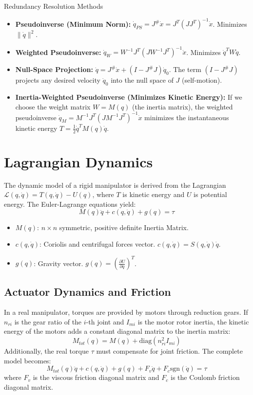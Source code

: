 \documentclass[11pt,a4paper]{article}
\begin{document}
\begin{theorybox}{Redundancy Resolution Methods}
\begin{itemize}
    \item \textbf{Pseudoinverse (Minimum Norm):} $\dot{q}_{PS} = J^\# \dot{x} = J^T(JJ^T)^{-1}\dot{x}$. Minimizes $\|\dot{q}\|^2$.
    \item \textbf{Weighted Pseudoinverse:} $\dot{q}_W = W^{-1}J^T(J W^{-1} J^T)^{-1}\dot{x}$. Minimizes $\dot{q}^T W \dot{q}$.
    \item \textbf{Null-Space Projection:} $\dot{q} = J^\# \dot{x} + (I - J^\# J)\dot{q}_0$. The term $(I - J^\# J)$ projects any desired velocity $\dot{q}_0$ into the null space of $J$ (self-motion).
    \item \textbf{Inertia-Weighted Pseudoinverse (Minimizes Kinetic Energy):} If we choose the weight matrix $W = M(q)$ (the inertia matrix), the weighted pseudoinverse $\dot{q}_M = M^{-1}J^T(J M^{-1} J^T)^{-1}\dot{x}$ minimizes the instantaneous kinetic energy $T = \frac{1}{2}\dot{q}^T M(q) \dot{q}$.
\end{itemize}
\end{theorybox}


\section{Lagrangian Dynamics}
The dynamic model of a rigid manipulator is derived from the Lagrangian $\mathcal{L}(q, \dot{q}) = T(q, \dot{q}) - U(q)$, where $T$ is kinetic energy and $U$ is potential energy. The Euler-Lagrange equations yield:
\begin{equation}
    M(q)\ddot{q} + c(q, \dot{q}) + g(q) = \tau
\end{equation}
\begin{itemize}
    \item $M(q)$: $n \times n$ symmetric, positive definite Inertia Matrix.
    \item $c(q, \dot{q})$: Coriolis and centrifugal forces vector. $c(q,\dot{q}) = S(q,\dot{q})\dot{q}$.
    \item $g(q)$: Gravity vector. $g(q) = (\frac{\partial U}{\partial q})^T$.
\end{itemize}

\subsection{Actuator Dynamics and Friction}
In a real manipulator, torques are provided by motors through reduction gears. If $n_{ri}$ is the gear ratio of the $i$-th joint and $I_{mi}$ is the motor rotor inertia, the kinetic energy of the motors adds a constant diagonal matrix to the inertia matrix:
\begin{equation}
    M_{tot}(q) = M(q) + \text{diag}(n_{ri}^2 I_{mi})
\end{equation}
Additionally, the real torque $\tau$ must compensate for joint friction. The complete model becomes:
\begin{equation}
    M_{tot}(q)\ddot{q} + c(q, \dot{q}) + g(q) + F_v \dot{q} + F_c \text{sgn}(\dot{q}) = \tau
\end{equation}
where $F_v$ is the viscous friction diagonal matrix and $F_c$ is the Coulomb friction diagonal matrix.
\end{document}
